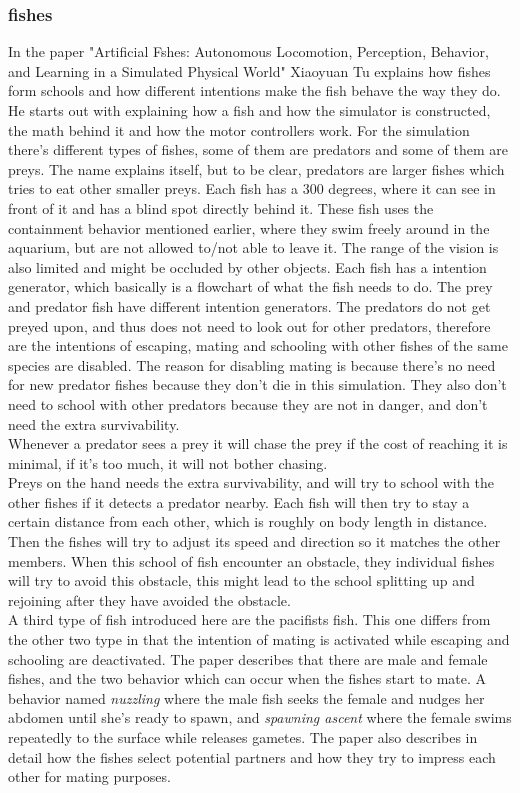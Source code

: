 \subsubsection{fishes}
In the paper "Artificial Fshes: Autonomous Locomotion, Perception, Behavior, and Learning in a Simulated Physical World"  Xiaoyuan Tu \cite{Demetri1994}  explains how fishes form schools and how different intentions make the fish behave the way they do. He starts out with explaining how a fish and how the simulator is constructed, the math behind it and how the motor controllers work. For the simulation there's different types of fishes, some of them are predators and some of them are preys. The name explains itself, but to be clear, predators are larger fishes which tries to eat other smaller preys. Each fish has a 300 degrees, where it can see in front of it and has a blind spot directly behind it. These fish uses the containment behavior mentioned earlier, where they swim freely around in the aquarium, but are not allowed to/not able to leave it.
The range of the vision is also limited and might be occluded by other objects. Each fish has a intention generator, which basically is a flowchart of what the fish needs to do. The prey and predator fish have different intention generators. The predators do not get preyed upon, and thus does not need to look out for other predators, therefore are the intentions of escaping, mating and schooling with other fishes of the same species are disabled. The reason for disabling mating is because there's no need for new predator fishes because they don't die in this simulation. They also don't need to school with other predators because they are not in danger, and don't need the extra survivability.\\
Whenever a predator sees a prey it will chase the prey if the cost of reaching it is minimal, if it's too much, it will not bother chasing. \\
Preys on the hand needs the extra survivability, and will try to school with the other fishes if it detects a predator nearby. Each fish will then try to stay a certain distance from each other, which is roughly on body length in distance. Then the fishes will try to adjust its speed and direction so it matches the other members. When this school of fish encounter an obstacle, they individual fishes will try to avoid this obstacle, this might lead to the school splitting up and rejoining after they have avoided the obstacle. \\
A third type of fish introduced here are the pacifists fish. This one differs from the other two type in that the intention of mating is activated while escaping and schooling are deactivated.
The paper describes that there are male and female fishes, and the two behavior which can occur when the fishes start to mate. A behavior named \textit{nuzzling} where the male fish seeks the female and nudges her abdomen until she's ready to spawn, and \textit{spawning ascent} where the female swims repeatedly to the surface while releases gametes. The paper also describes in detail how the fishes select potential partners and how they try to impress each other for mating purposes.

